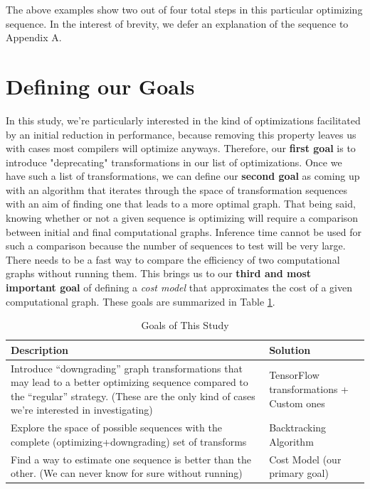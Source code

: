 \documentclass[12pt,a4paper,twoside,openright,bibliography=totocnumbered]{report}
\begin{document}
The above examples show two out of four total steps in this particular optimizing sequence. In the interest of brevity, we defer an explanation of the sequence to Appendix A.

\section{Defining our Goals}
In this study, we're particularly interested in the kind of optimizations facilitated by an initial reduction in performance, because removing this property leaves us with cases most compilers will optimize anyways. Therefore, our \textbf{first goal} is to introduce "deprecating" transformations in our list of optimizations. Once we have such a list of transformations, we can define our \textbf{second goal} as coming up with an algorithm that iterates through the space of transformation sequences with an aim of finding one that leads to a more optimal graph. That being said, knowing whether or not a given sequence is optimizing will require a comparison between initial and final computational graphs. Inference time cannot be used for such a comparison because the number of sequences to test will be very large. There needs to be a fast way to compare the efficiency of two computational graphs without running them. This brings us to our \textbf{third and most important goal} of defining a \textit{cost model} that approximates the cost of a given computational graph. These goals are summarized in Table \ref{tab1}.

\renewcommand{\arraystretch}{1.5} %
\setlength{\tabcolsep}{10pt} %

\begin{table}[]
    \centering
    \begin{tabularx}{\textwidth}{|>{\centering\arraybackslash}X|>{\centering\arraybackslash}X|}
        \hline
        \textbf{Description} & \textbf{Solution} \\
        \hline
        Introduce “downgrading” graph transformations that may lead to a better optimizing sequence compared to the “regular” strategy. (These are the only kind of cases we’re interested in investigating) 
        & TensorFlow transformations + Custom ones \\
        \hline
        Explore the space of possible sequences with the complete (optimizing+downgrading) set of transforms 
        & Backtracking Algorithm \\
        \hline
        Find a way to estimate one sequence is better than the other. (We can never know for sure without running) 
        & Cost Model (our primary goal) \\
        \hline
    \end{tabularx}
    \caption{Goals of This Study}
    \label{tab1}
\end{table}
\end{document}
